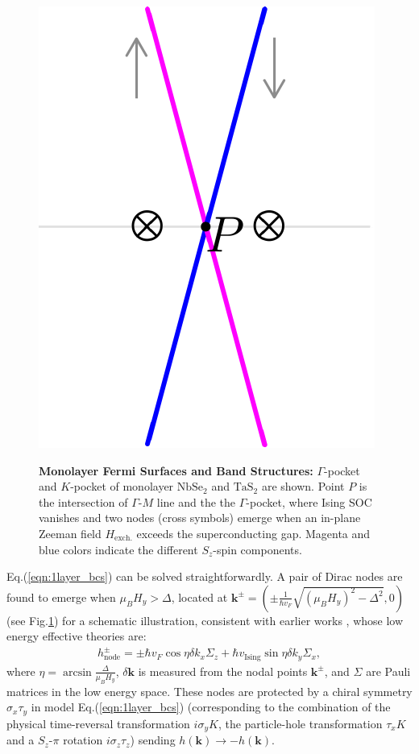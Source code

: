 \begin{figure}
{		\includegraphics[scale=0.4]{contents/Ising_Top/figures/pdf_files/node.pdf}
	}
	\caption{{\bf Monolayer Fermi Surfaces and Band Structures:} $\Gamma$-pocket and $K$-pocket of monolayer $\mathrm{NbSe_2}$ and $\mathrm{TaS_2}$ are shown. Point $P$ is the intersection of $\Gamma$-$M$ line and the the $\Gamma$-pocket, where Ising SOC vanishes and two nodes (cross symbols) emerge when an in-plane Zeeman field $H_{\text{exch.}}$ exceeds the superconducting gap. Magenta and blue colors indicate the different $S_z$-spin components.}
	\label{fig: monolayer FS}
\end{figure}
Eq.(\ref{eqn:1layer_bcs}) can be solved straightforwardly. A pair of Dirac nodes are found to emerge when $\mu_B H_y>\Delta$, located at $\bm k^{\pm}=(\pm \frac{1}{\hbar v_F} \sqrt{(\mu_B H_y)^2-\Delta^2},0)$ (see Fig.\ref{fig: monolayer FS}) for a schematic illustration, consistent with earlier works \cite{he2018magnetic,shaffer2020crystalline}, whose low energy effective theories are:
\begin{align}
	h^{\pm}_{\text{node}}=\pm\hbar v_F \cos\eta \delta k_x\Sigma_z+\hbar v_{\text{Ising}}\sin\eta \delta k_y\Sigma_x,\label{eqn:1layer_eff}
\end{align}
where $\eta=\arcsin\frac{\Delta}{\mu_B H_y}$, $\delta \bm k$ is measured from the nodal points $\bm k^{\pm}$, and $\Sigma$ are Pauli matrices in the low energy space. These nodes are protected by a chiral symmetry $\sigma_x\tau_y$ in model Eq.(\ref{eqn:1layer_bcs}) (corresponding to the combination of the physical time-reversal transformation $i\sigma_yK$, the particle-hole transformation $\tau_x K$ and a $S_z$-$\pi$ rotation $i\sigma_z\tau_z$) sending $h(\bm k)\rightarrow -h(\bm k)$.
